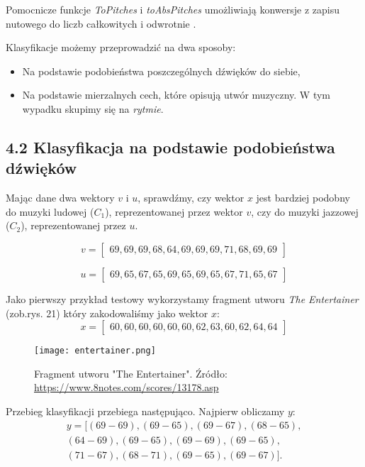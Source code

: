 Pomocnicze funkcje \textit{ToPitches} i \textit{toAbsPitches} umożliwiają konwersje z  zapisu nutowego do liczb całkowitych i odwrotnie \citep[s. 60]{HSOM_2018}.

Klasyfikacje możemy przeprowadzić na dwa sposoby:
\begin{itemize}
    \item Na podstawie podobieństwa poszczególnych dźwięków do siebie,
    \item Na podstawie mierzalnych cech, które opisują utwór muzyczny. W tym wypadku skupimy się na \textit{rytmie}.
\end{itemize}

\subsection{4.2 Klasyfikacja na podstawie podobieństwa dźwięków}
Mając dane dwa wektory $v$ i $u$, sprawdźmy, czy wektor $x$ jest bardziej podobny do muzyki ludowej ($C_{1}$), reprezentowanej przez wektor $v$, czy do muzyki jazzowej ($C_{2}$), reprezentowanej przez $u$. 

\begin{equation*}
v =
\begin{bmatrix}
69,69,69,68,64,69,69,69,71,68,69,69
\end{bmatrix}
\end{equation*}

\begin{equation*}
    u =
    \begin{bmatrix}
    69,65,67,65,69,65,69,65,67,71,65,67
    \end{bmatrix}
\end{equation*}

Jako pierwszy przykład testowy wykorzystamy fragment utworu \textit{The Entertainer} (zob.rys. 21) który zakodowaliśmy jako wektor $x$:
\begin{equation*}
x =
    \begin{bmatrix}
   60,60,60,60,60,60,62,63,60,62,64,64
    \end{bmatrix}
\end{equation*}

\begin{figure}[H]
\texttt{[image: entertainer.png]}
\centering
\caption{Fragment utworu "The Entertainer". Źródło: \url{https://www.8notes.com/scores/13178.asp}}
\centering
\end{figure}

Przebieg klasyfikacji przebiega następująco. Najpierw obliczamy $y$:
\begin{align*}
y = [(69 - 69), (69 - 65), (69 - 67), (68 - 65), \\ (64 - 69), 
(69 - 65), (69 - 69), (69 - 65),\\ (71 - 67), (68 - 71), (69 - 65), (69 - 67)].
\end{align*}

